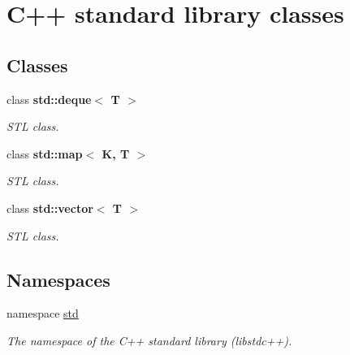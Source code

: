 \hypertarget{group__stdcpp}{
\section{C++ standard library classes}
\label{group__stdcpp}
}
\subsection*{Classes}
\begin{DoxyCompactItemize}
\item 
class {\bfseries std::deque$<$ T $>$}
\begin{DoxyCompactList}\small\item\em STL class. \item\end{DoxyCompactList}\item 
class {\bfseries std::map$<$ K, T $>$}
\begin{DoxyCompactList}\small\item\em STL class. \item\end{DoxyCompactList}\item 
class {\bfseries std::vector$<$ T $>$}
\begin{DoxyCompactList}\small\item\em STL class. \item\end{DoxyCompactList}\end{DoxyCompactItemize}
\subsection*{Namespaces}
\begin{DoxyCompactItemize}
\item 
namespace \hyperlink{namespacestd}{std}


\begin{DoxyCompactList}\small\item\em The namespace of the C++ standard library (libstdc++). \item\end{DoxyCompactList}

\end{DoxyCompactItemize}
